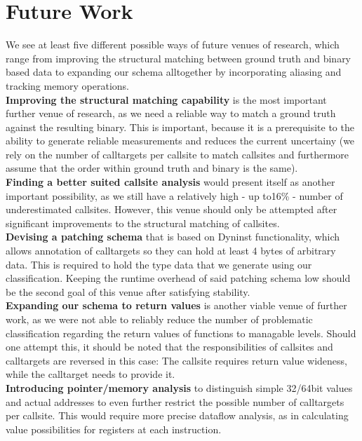 \chapter{Future Work}
\label{chapter:Future_Work}
We see at least five different possible ways of future venues of research, which range from improving the structural matching between ground truth and binary based data to expanding our schema alltogether by incorporating aliasing and tracking memory operations.\\

\textbf{Improving the structural matching capability} is the most important further venue of research, as we need a reliable way to match a ground truth against the resulting binary. This is important, because it is a prerequisite to the ability to generate reliable measurements and reduces the current uncertainy (we rely on the number of calltargets per callsite to match callsites and furthermore assume that the order within ground truth and binary is the same).\\

\textbf{Finding a better suited callsite analysis} would present itself as another important possibility, as we still have a relatively high - up to16\% - number of underestimated callsites. However, this venue should only be attempted after significant improvements to the structural matching of callsites.\\

\textbf{Devising a patching schema} that is based on Dyninst functionality, which allows annotation of calltargets so they can hold at least 4 bytes of arbitrary data. This is required to hold the type data that we generate using our classification. Keeping the runtime overhead of said patching schema low should be the second goal of this venue after satisfying stability.\\

\textbf{Expanding our schema to return values} is another viable venue of further work, as we were not able to reliably reduce the number of problematic classification regarding the return values of functions to managable levels. Should one attempt this, it should be noted that the responsibilities of callsites and calltargets are reversed in this case: The callsite requires return value wideness, while the calltarget needs to provide it.\\

\textbf{Introducing pointer/memory analysis} to distinguish simple 32/64bit values and actual addresses to even further restrict the possible number of calltargets per callsite. This would require more precise dataflow analysis, as in calculating value possibilities for registers at each instruction.
